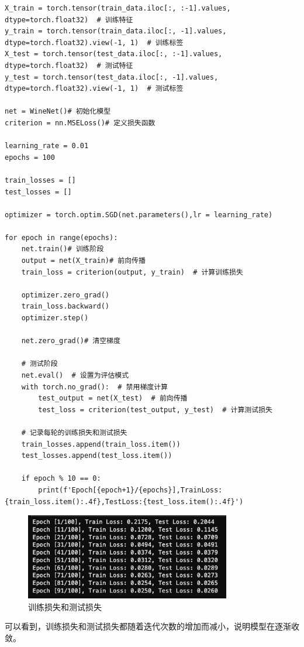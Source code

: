 \documentclass[12pt,a4paper,oneside]{article}
\begin{document}
\begin{lstlisting}
X_train = torch.tensor(train_data.iloc[:, :-1].values, dtype=torch.float32)  # 训练特征
y_train = torch.tensor(train_data.iloc[:, -1].values, dtype=torch.float32).view(-1, 1)  # 训练标签
X_test = torch.tensor(test_data.iloc[:, :-1].values, dtype=torch.float32)  # 测试特征
y_test = torch.tensor(test_data.iloc[:, -1].values, dtype=torch.float32).view(-1, 1)  # 测试标签

net = WineNet()# 初始化模型
criterion = nn.MSELoss()# 定义损失函数

learning_rate = 0.01
epochs = 100

train_losses = []
test_losses = []

optimizer = torch.optim.SGD(net.parameters(),lr = learning_rate)

for epoch in range(epochs):
    net.train()# 训练阶段
    output = net(X_train)# 前向传播
    train_loss = criterion(output, y_train)  # 计算训练损失

    optimizer.zero_grad()
    train_loss.backward()
    optimizer.step()

    net.zero_grad()# 清空梯度

    # 测试阶段
    net.eval()  # 设置为评估模式
    with torch.no_grad():  # 禁用梯度计算
        test_output = net(X_test)  # 前向传播
        test_loss = criterion(test_output, y_test)  # 计算测试损失

    # 记录每轮的训练损失和测试损失
    train_losses.append(train_loss.item())
    test_losses.append(test_loss.item())

    if epoch % 10 == 0:
        print(f'Epoch[{epoch+1}/{epochs}],TrainLoss:{train_loss.item():.4f},TestLoss:{test_loss.item():.4f}')
\end{lstlisting}

\begin{figure}[H]
    \centering
    \includegraphics[width=0.8\textwidth]{image/2.png}
    \caption{训练损失和测试损失}
\end{figure}

可以看到，训练损失和测试损失都随着迭代次数的增加而减小，说明模型在逐渐收敛。
\end{document}
